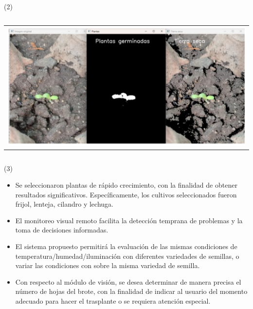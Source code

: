 \begin{frame}{\citetitle{\EntradaBibtex} (2)}
\begin{columns}
\begin{tabular}{c}
		\includegraphics[width=0.9\linewidth]{2024_GerminadorAutomatico/figs/ModuloVision.png} \\
	\end{tabular}

\end{columns}

\end{frame}

\begin{frame}{\citetitle{\EntradaBibtex} (3)}
\begin{itemize}
	\item Se seleccionaron plantas de rápido crecimiento, con la finalidad de obtener resultados significativos. Específicamente, los cultivos seleccionados fueron frijol, lenteja, cilandro y lechuga.
    \item El monitoreo visual remoto facilita la detección temprana de problemas y la toma de decisiones informadas.
    \item El sistema propuesto permitirá la evaluación de las mismas condiciones de temperatura/humedad/iluminación con diferentes variedades de semillas, o variar las condiciones con sobre la misma variedad de semilla.  
    \item Con respecto al módulo de visión, se desea determinar de manera precisa el número de hojas del brote, con la finalidad de indicar al usuario del momento adecuado para hacer el trasplante o se requiera atención especial.
\end{itemize}
\end{frame}




